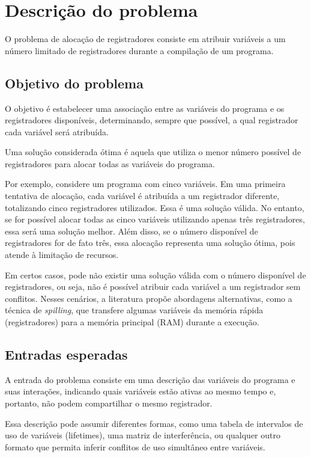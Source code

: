 \section{Descrição do problema}

O problema de alocação de registradores consiste em atribuir variáveis a um número limitado de registradores durante a compilação de um programa.

\subsection{Objetivo do problema}

O objetivo é estabelecer uma associação entre as variáveis do programa e os registradores disponíveis,
determinando, sempre que possível, a qual registrador cada variável será atribuída.

Uma solução considerada ótima é aquela que utiliza o menor número possível de registradores para
alocar todas as variáveis do programa.

Por exemplo, considere um programa com cinco variáveis. Em uma primeira tentativa de alocação, cada variável é atribuída
a um registrador diferente, totalizando cinco registradores utilizados. Essa é uma solução válida.
No entanto, se for possível alocar todas as cinco variáveis utilizando apenas três registradores,
essa será uma solução melhor. Além disso, se o número disponível de registradores for de fato três,
essa alocação representa uma solução ótima, pois atende à limitação de recursos.

Em certos casos, pode não existir uma solução válida com o número disponível de registradores, ou seja, não é possível
atribuir cada variável a um registrador sem conflitos. Nesses cenários, a literatura propõe abordagens alternativas,
como a técnica de \textit{spilling}, que transfere algumas variáveis da memória rápida (registradores) para
a memória principal (RAM) durante a execução.

\subsection{Entradas esperadas}

A entrada do problema consiste em uma descrição das variáveis do programa e suas interações,
indicando quais variáveis estão ativas ao mesmo tempo e, portanto, não podem compartilhar o mesmo registrador.

Essa descrição pode assumir diferentes formas, como uma tabela de intervalos de uso de variáveis (lifetimes),
uma matriz de interferência, ou qualquer outro formato que permita inferir conflitos de uso simultâneo entre variáveis.

